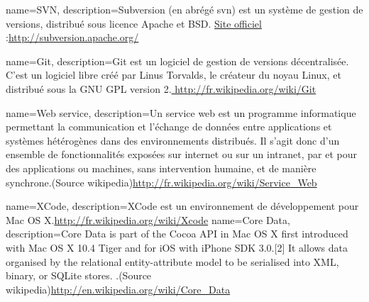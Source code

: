 {name={SVN},
description={Subversion (en abrégé svn) est un système de gestion de versions, distribué sous licence Apache et BSD. \href{http://subversion.apache.org/}{Site officiel} :\url{http://subversion.apache.org/}
}
}

{name={Git},
description={Git est un logiciel de gestion de versions décentralisée. C'est un logiciel libre créé par Linus Torvalds, le créateur du noyau Linux, et distribué sous la GNU GPL version 2.\url{ http://fr.wikipedia.org/wiki/Git}} 
}



{name={Web service},
description={Un service web est un programme informatique permettant la communication et l'échange de données entre applications et systèmes hétérogènes dans des environnements distribués. Il s'agit donc d'un ensemble de fonctionnalités exposées sur internet ou sur un intranet, par et pour des applications ou machines, sans intervention humaine, et de manière synchrone.(Source wikipedia)\url{http://fr.wikipedia.org/wiki/Service_Web}
}
}


{name={XCode},
description={XCode est un environnement de développement pour Mac OS X.\url{http://fr.wikipedia.org/wiki/Xcode}
}
}
{name={Core Data},
description={Core Data is part of the Cocoa API in Mac OS X first introduced with Mac OS X 10.4 Tiger and for iOS with iPhone SDK 3.0.[2] It allows data organised by the relational entity-attribute model to be serialised into XML, binary, or SQLite stores. 
.(Source wikipedia)\url{http://en.wikipedia.org/wiki/Core\_Data}
}
}
